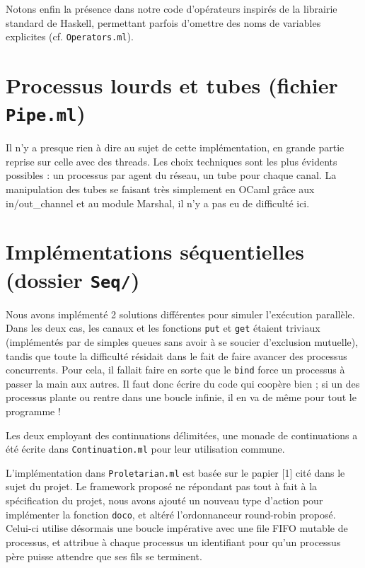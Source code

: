 \documentclass[a4paper, 11pt]{article}
\begin{document}
Notons enfin la présence dans notre code d'opérateurs inspirés de
la librairie standard de Haskell, permettant parfois d'omettre des
noms de variables explicites (cf. \texttt{Operators.ml}).


\section*{Processus lourds et tubes (fichier \texttt{Pipe.ml})}

Il n'y a presque rien à dire au sujet de cette implémentation, en
grande partie reprise sur celle avec des threads. Les choix techniques
sont les plus évidents possibles : un processus par agent du réseau,
un tube pour chaque canal. La manipulation des tubes se faisant très
simplement en OCaml grâce aux in/out\_channel et au module Marshal,
il n'y a pas eu de difficulté ici.


\section*{Implémentations séquentielles (dossier \texttt{Seq/})}

Nous avons implémenté 2 solutions différentes pour simuler l'exécution
parallèle. Dans les deux cas, les canaux et les fonctions \texttt{put}
et \texttt{get} étaient triviaux (implémentés par de simples queues
sans avoir à se soucier d'exclusion mutuelle), tandis que toute la
difficulté résidait dans le fait de faire avancer des processus
concurrents. Pour cela, il fallait faire en sorte que le \texttt{bind}
force un processus à \og passer la main \fg aux autres. Il faut donc
écrire du code qui coopère bien ; si un des processus plante ou rentre
dans une boucle infinie, il en va de même pour tout le programme !

Les deux employant des continuations délimitées, une monade de 
continuations a été écrite dans \texttt{Continuation.ml} pour leur
utilisation commune.

L'implémentation dans \texttt{Proletarian.ml} est basée sur le papier [1]
cité dans le sujet du projet. Le framework proposé ne répondant pas
tout à fait à la spécification du projet, nous avons ajouté un nouveau
type d'action pour implémenter la fonction \texttt{doco}, et altéré
l'ordonnanceur round-robin proposé. Celui-ci utilise désormais une boucle
impérative avec une file FIFO mutable de processus, et attribue à
chaque processus un identifiant pour qu'un processus père puisse
attendre que ses fils se terminent.
\end{document}
